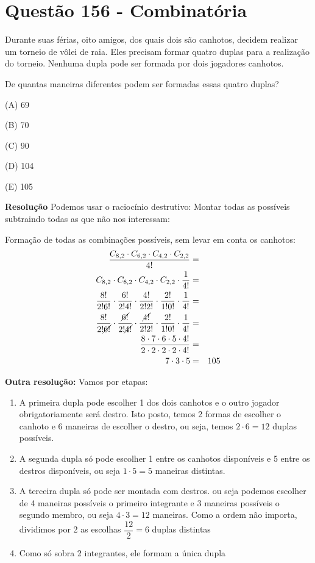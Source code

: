 \section{Questão 156 - Combinatória}

Durante suas férias, oito amigos, dos quais dois são canhotos, decidem realizar um torneio de vôlei de raia.
Eles precisam formar quatro duplas para a realização do torneio. Nenhuma dupla pode ser formada por dois jogadores canhotos.

De quantas maneiras diferentes podem ser formadas essas quatro duplas?

\noindent (A)  69

\noindent (B)  70

\noindent (C)  90

\noindent (D)  104

\noindent (E) 105

\textbf{Resolução}
Podemos usar o raciocínio destrutivo: Montar todas as possíveis subtraindo todas as que não nos interessam:

\renewcommand{\CancelColor}{\color{red}}

Formação de todas as combinações possíveis, sem levar em conta os canhotos: 
\begin{eqnarray*}
\dfrac{C_{8, 2} \cdot C_{6, 2} \cdot C_{4, 2} \cdot C_{2, 2}  }{4!} &=& \\
C_{8, 2} \cdot C_{6, 2} \cdot C_{4, 2} \cdot C_{2, 2}  \cdot \dfrac{1}{4!} &=& \\
\dfrac{8!}{2! 6!} \cdot \dfrac{6!}{2! 4!} \cdot \dfrac{4!}{2! 2!} \cdot \dfrac{2!}{1! 0!} \cdot \dfrac{1}{4!}  &=& \\
\dfrac{8!}{2! \cancel{6!}} \cdot \dfrac{\cancel{6!}}{2! \cancel{4!}} \cdot \dfrac{\cancel{4!}}{2! 2!} \cdot \dfrac{2!}{1! 0!} \cdot \dfrac{1}{4!}  &=& \\
\dfrac{8 \cdot 7 \cdot 6 \cdot 5 \cdot 4!}{2 \cdot 2 \cdot 2 \cdot 2 \cdot 4!}  &=& \\
7 \cdot 3 \cdot 5  &=& 105\\
\end{eqnarray*}

\textbf{Outra resolução:}
Vamos por etapas:

\begin{enumerate}
    \item A primeira dupla pode escolher 1 dos dois canhotos e o outro jogador obrigatoriamente será destro. Isto posto, temos 2 formas de escolher o canhoto e 6 maneiras de escolher o destro, ou seja, temos $ 2 \cdot 6 = 12 $ duplas possíveis. 
    \item A segunda dupla só pode escolher 1 entre os canhotos disponíveis e 5 entre os destros disponíveis, ou seja $ 1 \cdot 5  = 5 $ maneiras distintas.
    \item A terceira dupla só pode ser montada com destros. ou seja podemos escolher de 4 maneiras possíveis o primeiro integrante e 3 maneiras possíveis o segundo membro, ou seja $ 4 \cdot 3  = 12 $ maneiras. Como a ordem não importa, dividimos por 2 as escolhas $ \dfrac{12}{2} = 6$ duplas distintas
    \item Como só sobra 2 integrantes, ele formam a única dupla
\end{enumerate}

